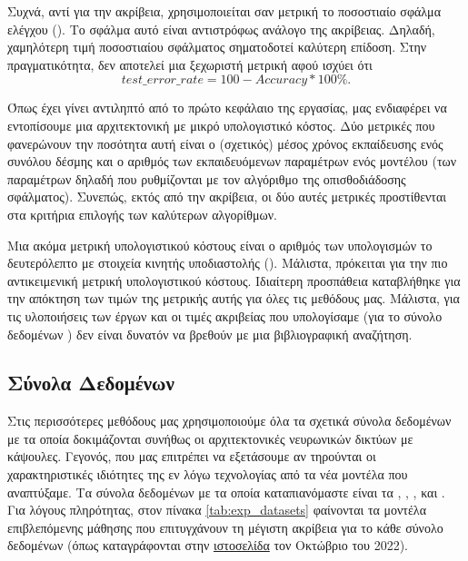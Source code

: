 Συχνά, αντί για την ακρίβεια, χρησιμοποιείται σαν μετρική το ποσοστιαίο σφάλμα ελέγχου (). Το σφάλμα αυτό είναι αντιστρόφως ανάλογο της ακρίβειας. Δηλαδή, χαμηλότερη τιμή ποσοστιαίου σφάλματος σηματοδοτεί καλύτερη επίδοση. Στην πραγματικότητα, δεν αποτελεί μια ξεχωριστή μετρική αφού ισχύει ότι $$test\_error\_rate = 100 - Accuracy*100\%.$$ \par

Όπως έχει γίνει αντιληπτό από το πρώτο κεφάλαιο της εργασίας, μας ενδιαφέρει να εντοπίσουμε μια αρχιτεκτονική με μικρό υπολογιστικό κόστος. Δύο μετρικές που φανερώνουν την ποσότητα αυτή είναι ο (σχετικός) μέσος χρόνος εκπαίδευσης ενός συνόλου δέσμης και ο αριθμός των εκπαιδευόμενων παραμέτρων ενός μοντέλου (των παραμέτρων δηλαδή που ρυθμίζονται με τον αλγόριθμο της οπισθοδιάδοσης σφάλματος). Συνεπώς, εκτός από την ακρίβεια, οι δύο αυτές μετρικές προστίθενται στα κριτήρια επιλογής των καλύτερων αλγορίθμων.\par
Μια ακόμα μετρική υπολογιστικού κόστους είναι ο αριθμός των υπολογισμών το δευτερόλεπτο με στοιχεία κινητής υποδιαστολής (). Μάλιστα, πρόκειται για την πιο αντικειμενική μετρική υπολογιστικού κόστους. Ιδιαίτερη προσπάθεια καταβλήθηκε για την απόκτηση των τιμών της μετρικής αυτής για όλες τις μεθόδους μας. Μάλιστα, για τις υλοποιήσεις των έργων \cite{sabour2017dynamic} και \cite{hinton2018matrix} οι τιμές ακριβείας που υπολογίσαμε (για το σύνολο δεδομένων ) δεν είναι δυνατόν να βρεθούν με μια βιβλιογραφική αναζήτηση.

\subsection{Σύνολα Δεδομένων}
Στις περισσότερες μεθόδους μας χρησιμοποιούμε όλα τα σχετικά σύνολα δεδομένων με τα οποία δοκιμάζονται συνήθως οι αρχιτεκτονικές νευρωνικών δικτύων με κάψουλες. Γεγονός, που μας επιτρέπει να εξετάσουμε αν τηρούνται οι χαρακτηριστικές ιδιότητες της εν λόγω τεχνολογίας από τα νέα μοντέλα που αναπτύξαμε. Τα σύνολα δεδομένων με τα οποία καταπιανόμαστε είναι τα \cite{deng2012mnist}, \cite{Xiao2017FashionMNISTAN}, \cite{CIFAR10}, \cite{sabour2017dynamic} και \cite{lecun2004learning}. Για λόγους πληρότητας, στον πίνακα \ref{tab:exp_datasets} φαίνονται τα μοντέλα επιβλεπόμενης μάθησης που επιτυγχάνουν τη μέγιστη ακρίβεια για το κάθε σύνολο δεδομένων (όπως καταγράφονται στην \href{https://paperswithcode.com/}{ιστοσελίδα} τον Οκτώβριο του 2022).


